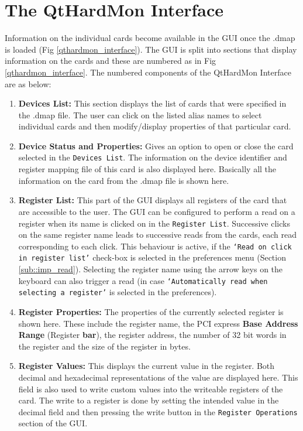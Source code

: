 \section{The QtHardMon Interface} Information on the individual cards become
available in the GUI once the .dmap is loaded (Fig \ref{qthardmon_interface}).
The GUI is split into sections that display information on the cards and these
are numbered as in Fig \ref{qthardmon_interface}. The numbered components of the
QtHardMon Interface are as below: 
\begin{enumerate} 
    \item \textbf{Devices List:}
    This section displays the list of cards that were specified in the
    .dmap file. The user can click on the listed alias names to select
    individual cards and then modify/display properties of that
    particular card. 

	\item \textbf{Device Status and Properties:} Gives an option to open or close
    the card selected in the \texttt{Devices List}. The information on the
    device identifier and register mapping file of this card is also displayed
    here. Basically all the information on the card from the .dmap file is shown
    here. 

	\item \textbf{Register List:} This part of the GUI displays all registers of the
    card that are accessible to the user. The GUI can be configured to perform a
    read on a register when its name is clicked on in the \texttt{Register
    List}. Successive clicks on the same register name leads to successive reads
    from the cards, each read corresponding to each click. This behaviour is
    active, if the \texttt{`Read on click in register list'} check-box is
    selected in the preferences menu (Section \ref{sub::imp_read}). Selecting
    the register name using the arrow keys on the keyboard can also trigger a
    read (in case \texttt{`Automatically read when selecting a register'} is
    selected in the preferences).

	\item \textbf{Register Properties:} The properties of the currently selected
    register is shown here. These include the register name, the PCI express
    \textbf{Base Address Range} (Register \textbf{bar}), the register address,
    the number of 32 bit words in the register and the size of the register in
    bytes.

	\item \textbf{Register Values:} This displays the current value in the register.
    Both decimal and hexadecimal representations of the value are displayed
    here. This field is also used to write custom values into the writeable
    registers of the card. The write to a register is done by setting the
    intended value in the decimal field and then pressing the write button in
    the \texttt{Register Operations} section of the GUI.


\end{enumerate}
